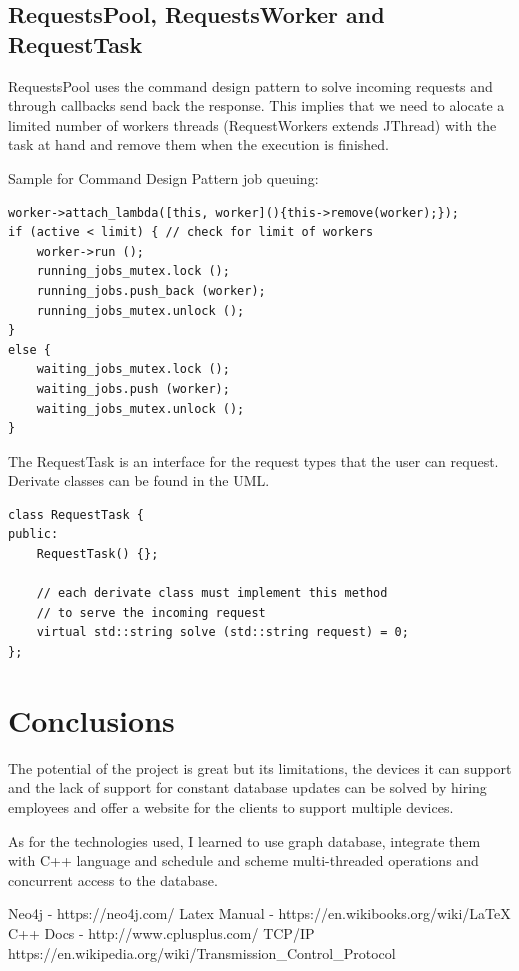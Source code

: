 \documentclass{llncs}
\begin{document}
		\subsection{RequestsPool, RequestsWorker and RequestTask}
			RequestsPool uses the command design pattern to solve incoming requests and through callbacks send back the response. This implies that we need to alocate a limited number of workers threads (RequestWorkers extends JThread) with the task at hand and remove them when the execution is finished.
			
Sample for Command Design Pattern job queuing:
			\begin{lstlisting}
worker->attach_lambda([this, worker](){this->remove(worker);});
if (active < limit) { // check for limit of workers 
	worker->run ();
	running_jobs_mutex.lock ();
	running_jobs.push_back (worker);
	running_jobs_mutex.unlock ();
}
else {
	waiting_jobs_mutex.lock ();
	waiting_jobs.push (worker);
	waiting_jobs_mutex.unlock ();
}
			\end{lstlisting}
			\newpage
			
			The RequestTask is an interface for the request types that the user can request. Derivate classes can be found in the UML.
			\begin{lstlisting}
class RequestTask {
public:
	RequestTask() {};
	
	// each derivate class must implement this method 
	// to serve the incoming request
	virtual std::string solve (std::string request) = 0;
};
			\end{lstlisting}
	\section{Conclusions}
	The potential of the project is great but its limitations, the devices it can support and the lack of support for constant database updates can be solved by hiring employees and offer a website for the clients to support multiple devices.
	
	As for the technologies used, I learned to use graph database, integrate them with C++ language and schedule and scheme multi-threaded operations and concurrent access to the database.	
	\begin{thebibliography}{4}
		 Neo4j - https://neo4j.com/
		 Latex Manual - https://en.wikibooks.org/wiki/LaTeX
		 C++ Docs - http://www.cplusplus.com/
		 TCP/IP https://en.wikipedia.org/wiki/Transmission\_Control\_Protocol
	\end{thebibliography}
\end{document}
